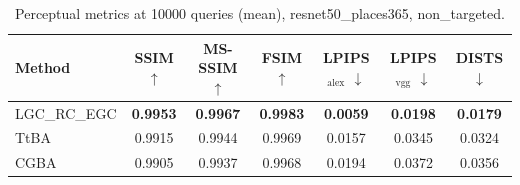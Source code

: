 \begin{table}[t]
\centering\footnotesize
\caption{Perceptual metrics at 10000 queries (mean), resnet50\_places365, non\_targeted.}
\begin{tabular}{lcccccc}
\toprule
Method & SSIM $\uparrow$ & MS-SSIM $\uparrow$ & FSIM $\uparrow$ & LPIPS$_{\mathrm{alex}}$ $\downarrow$ & LPIPS$_{\mathrm{vgg}}$ $\downarrow$ & DISTS $\downarrow$ \\
\midrule
LGC\_RC\_EGC & \textbf{0.9953} & \textbf{0.9967} & \textbf{0.9983} & \textbf{0.0059} & \textbf{0.0198} & \textbf{0.0179} \\
TtBA & 0.9915 & 0.9944 & 0.9969 & 0.0157 & 0.0345 & 0.0324 \\
CGBA & 0.9905 & 0.9937 & 0.9968 & 0.0194 & 0.0372 & 0.0356 \\
\bottomrule
\end{tabular}
\end{table}
